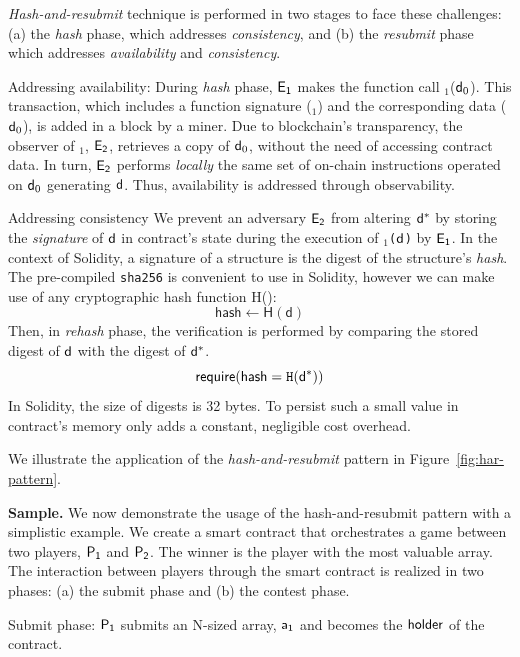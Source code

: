 \noindent
\emph{Hash-and-resubmit} technique is performed in two
stages to face these challenges: (a) the \emph{hash} phase, which addresses
\emph{consistency}, and (b) the \emph{resubmit} phase which addresses
\emph{availability} and \emph{consistency}.

\noindent \textsf{Addressing availability:} During \emph{hash} phase,
$\mathsf{E_{1}}$ makes the function call \texttt{\proc}$_1$($\mathsf{d}_0$). This
transaction, which includes a function signature (\texttt{\proc$_1$}) and the
corresponding data ($\mathsf{d}_0$), is added in a block by a miner. Due to
blockchain's transparency, the observer of \texttt{\proc}$_1$, $\mathsf{E_{2}}$,
retrieves a copy of $\mathsf{d}_0$, without the need of accessing contract data. In
turn, $\mathsf{E_{2}}$ performs \emph{locally} the same set of on-chain instructions
operated on $\mathsf{d}_0$ generating $\mathsf{d}$. Thus, availability is addressed
through observability.

\noindent \textsf{Addressing consistency} We prevent an adversary $\mathsf{E_{2}}$
from altering $\mathsf{d^*}$ by storing the \emph{signature} of $\mathsf{d}$ in contract's
state during the execution of \texttt{\proc$_1$($\mathsf{d}$)} by $\mathsf{E_{1}}$. In the
context of Solidity, a signature of a structure is the digest of the
structure's \emph{hash}. The pre-compiled \texttt{sha256} is convenient to use
in Solidity, however we can make use of any cryptographic hash function
\textsf{H()}: \[\textsf{hash} \gets \textsf{H}(\textsf{d})\] Then, in
\emph{rehash} phase, the verification is performed by comparing the stored
digest of $\mathsf{d}$ with the digest of $\mathsf{d^*}$.
\[\textsf{require}(\textsf{hash} = \texttt{H}(\mathsf{d^*}))\] \noindent In Solidity,
the size of digests is 32 bytes. To persist such a small value in contract's
memory only adds a constant, negligible cost overhead.

We illustrate the application of the \emph{hash-and-resubmit} pattern in
Figure~\ref{fig:har-pattern}.

\noindent \textbf{Sample.} We now demonstrate the usage of the
hash-and-resubmit pattern with a simplistic example. We create a smart contract
that orchestrates a game between two players, $\mathsf{P_1}$ and $\mathsf{P_2}$. The winner is
the player with the most valuable array. The interaction between players
through the smart contract is realized in two phases: (a) the submit phase and
(b) the contest phase.

\noindent \textsf{Submit phase:} $\mathsf{P_1}$ submits an N-sized array, $\mathsf{a_1}$ and
becomes the $\mathsf{holder}$ of the contract.

